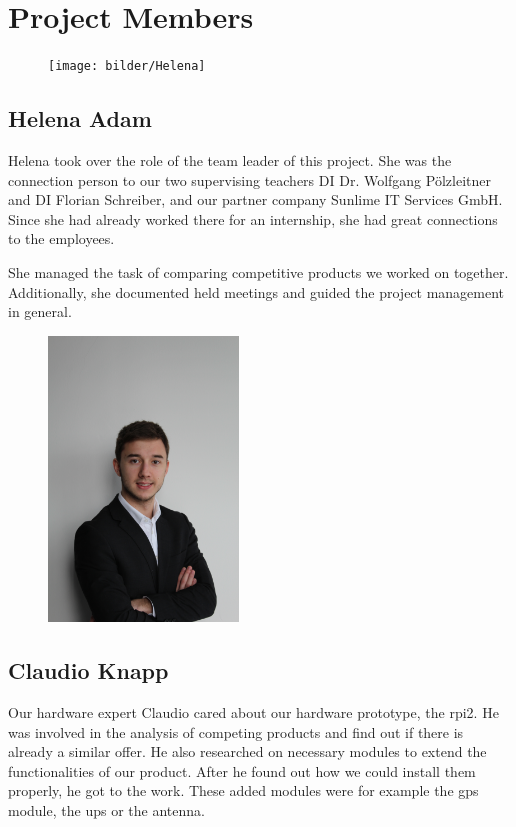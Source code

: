 \recalctypearea
\chapter*{Project Members}
\begin{figure}
    \texttt{[image: bilder/Helena]}
\end{figure}
\section*{Helena Adam}
Helena took over the role of the team leader of this project. She was the connection person to our two supervising teachers DI Dr. Wolfgang Pölzleitner and DI Florian Schreiber, and our partner company Sunlime IT Services GmbH. Since she had already worked there for an internship, she had great connections to the employees.

She managed the task of comparing competitive products we worked on together. Additionally, she documented held meetings and guided the project management in general.
\begin{figure}
	\includegraphics[width=0.45\textwidth, angle =-90]{bilder/Claudio}
\end{figure}
\section*{Claudio Knapp}
Our hardware expert Claudio cared about our hardware prototype, the \gls{rpi2}. He was involved in the analysis of competing products and find out if there is already a similar offer. He also researched on necessary modules to extend the functionalities of our product. After he found out how we could install them properly, he got to the work. These added modules were for example the \gls{gps} module, the \gls{ups} or the antenna.

